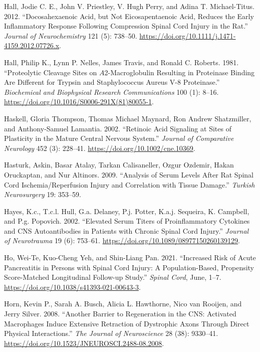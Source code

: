 \documentclass[9pt,lineno]{elife}
\newlength{\cslhangindent}
\newlength{\cslentryspacingunit} %
\newenvironment{CSLReferences}[2] %
 {%
  \setlength{\parindent}{0pt}
  \ifodd #1
  \let\oldpar\par
  \def\par{\hangindent=\cslhangindent\oldpar}
  \fi
  \setlength{\parskip}{#2\cslentryspacingunit}
 }%
 {}
\begin{document}
\begin{CSLReferences}{1}{0}
\leavevmode{}%
Hall, Jodie C. E., John V. Priestley, V. Hugh Perry, and Adina T. Michael-Titus. 2012. {``Docosahexaenoic Acid, but Not Eicosapentaenoic Acid, Reduces the Early Inflammatory Response Following Compression Spinal Cord Injury in the Rat.''} \emph{Journal of Neurochemistry} 121 (5): 738--50. \url{https://doi.org/10.1111/j.1471-4159.2012.07726.x}.

\leavevmode{}%
Hall, Philip K., Lynn P. Nelles, James Travis, and Ronald C. Roberts. 1981. {``Proteolytic Cleavage Sites on {\(A\)}2-Macroglobulin Resulting in Proteinase Binding Are Different for Trypsin and Staphylococcus Aureus {V-8} Proteinase.''} \emph{Biochemical and Biophysical Research Communications} 100 (1): 8--16. \url{https://doi.org/10.1016/S0006-291X(81)80055-1}.

\leavevmode{}%
Haskell, Gloria Thompson, Thomas Michael Maynard, Ron Andrew Shatzmiller, and Anthony-Samuel Lamantia. 2002. {``Retinoic Acid Signaling at Sites of Plasticity in the Mature Central Nervous System.''} \emph{Journal of Comparative Neurology} 452 (3): 228--41. \url{https://doi.org/10.1002/cne.10369}.

\leavevmode{}%
Hasturk, Askin, Basar Atalay, Tarkan Calisaneller, Ozgur Ozdemir, Hakan Oruckaptan, and Nur Altinors. 2009. {``Analysis of {Serum Levels} After {Rat Spinal Cord Ischemia}/{Reperfusion Injury} and {Correlation} with {Tissue Damage}.''} \emph{Turkish Neurosurgery} 19: 353--59.

\leavevmode{}%
Hayes, K.c., T.c.l. Hull, G.a. Delaney, P.j. Potter, K.a.j. Sequeira, K. Campbell, and P.g. Popovich. 2002. {``Elevated {Serum Titers} of {Proinflammatory Cytokines} and {CNS Autoantibodies} in {Patients} with {Chronic Spinal Cord Injury}.''} \emph{Journal of Neurotrauma} 19 (6): 753--61. \url{https://doi.org/10.1089/08977150260139129}.

\leavevmode{}%
Ho, Wei-Te, Kuo-Cheng Yeh, and Shin-Liang Pan. 2021. {``Increased Risk of Acute Pancreatitis in Persons with Spinal Cord Injury: A Population-Based, Propensity Score-Matched Longitudinal Follow-up Study.''} \emph{Spinal Cord}, June, 1--7. \url{https://doi.org/10.1038/s41393-021-00643-3}.

\leavevmode{}%
Horn, Kevin P., Sarah A. Busch, Alicia L. Hawthorne, Nico van Rooijen, and Jerry Silver. 2008. {``Another {Barrier} to {Regeneration} in the {CNS}: {Activated Macrophages Induce Extensive Retraction} of {Dystrophic Axons} Through {Direct Physical Interactions}.''} \emph{The Journal of Neuroscience} 28 (38): 9330--41. \url{https://doi.org/10.1523/JNEUROSCI.2488-08.2008}.


\end{CSLReferences}
\end{document}
